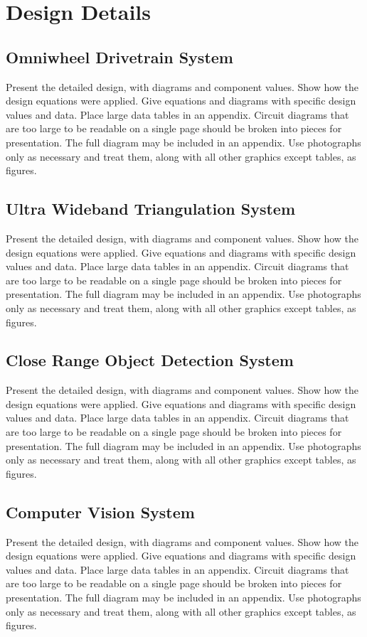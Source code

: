 \documentclass{report}
\begin{document}
    \section{Design Details}

    \subsection{Omniwheel Drivetrain System}
    Present the detailed design, with diagrams and component values. Show how the design equations were applied. Give equations and diagrams with specific design values and data. Place large data tables in an appendix. Circuit diagrams that are too large to be readable on a single page should be broken into pieces for presentation. The full diagram may be included in an appendix. Use photographs only as necessary and treat them, along with all other graphics except tables, as figures.

    \subsection{Ultra Wideband Triangulation System}
    Present the detailed design, with diagrams and component values. Show how the design equations were applied. Give equations and diagrams with specific design values and data. Place large data tables in an appendix. Circuit diagrams that are too large to be readable on a single page should be broken into pieces for presentation. The full diagram may be included in an appendix. Use photographs only as necessary and treat them, along with all other graphics except tables, as figures.

    \subsection{Close Range Object Detection System}
    Present the detailed design, with diagrams and component values. Show how the design equations were applied. Give equations and diagrams with specific design values and data. Place large data tables in an appendix. Circuit diagrams that are too large to be readable on a single page should be broken into pieces for presentation. The full diagram may be included in an appendix. Use photographs only as necessary and treat them, along with all other graphics except tables, as figures.

    \subsection{Computer Vision System}
    Present the detailed design, with diagrams and component values. Show how the design equations were applied. Give equations and diagrams with specific design values and data. Place large data tables in an appendix. Circuit diagrams that are too large to be readable on a single page should be broken into pieces for presentation. The full diagram may be included in an appendix. Use photographs only as necessary and treat them, along with all other graphics except tables, as figures.
\end{document}
